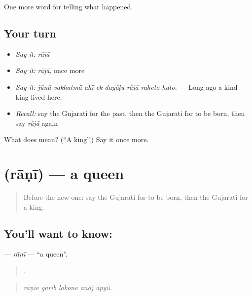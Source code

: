 \begin{grammarlens}[title={What you've built}]
One more word for telling what happened.
\end{grammarlens}

\subsection*{Your turn}
\begin{itemize}
\raggedright
  \item \emph{Say it:} \emph{rājā}
  \item \emph{Say it:} \emph{rājā}, once more
  \item \emph{Say it:} \emph{jūnā vakhatmā̃ ahī̃ ek dayāḷu rājā raheto hato.} — Long ago a kind king lived here.
  \item \emph{Recall:} say the Gujarati for the past, then the Gujarati for to be born, then say \emph{rājā} again
\end{itemize}

\begin{tcolorbox}[breakable,colback=teal!4,colframe=teal!35!black,title={Before you move on}]
What does  mean? (\textquotedblleft{}A king\textquotedblright{}.) Say it once more.
\end{tcolorbox}
\section[\texorpdfstring{\gu{રાણી} (rāṇī)}{રાણી (rāṇī)}]{ (rāṇī) — a queen}

\label{lesson:GU-C318-rani}



\begin{quote}
Before the new one: say the Gujarati for to be born, then the Gujarati for a king.
\end{quote}

\subsection*{You'll want to know: }
\textbf{} — \emph{rāṇī} — \textquotedblleft{}a queen\textquotedblright{}.

\begin{quote}
    .
\end{quote}

\begin{quote}
\emph{rāṇīe garīb lokone anāj āpyũ.}
\end{quote}

